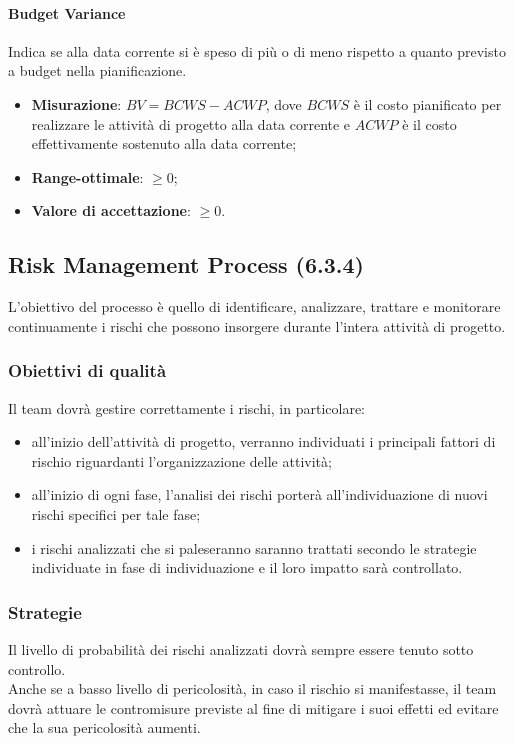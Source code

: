 \paragraph{Budget Variance}
\label{budgetVariance}
Indica se alla data corrente si è speso di più o di meno rispetto a quanto previsto a budget nella pianificazione.
\begin{itemize}
\item \textbf{Misurazione}: $BV = BCWS - ACWP$, dove $BCWS$ è il costo pianificato per realizzare le attività di progetto alla data corrente e $ACWP$ è il costo effettivamente sostenuto alla data corrente;
\item \textbf{Range-ottimale}: $\geq 0$;
\item \textbf{Valore di accettazione}: $\geq 0$.
\end{itemize}

\subsection{Risk Management Process (6.3.4)}
\label{riskMgmt}
L'obiettivo del processo è quello di identificare, analizzare, trattare e monitorare continuamente i rischi che possono insorgere durante l'intera attività di progetto.
\subsubsection{Obiettivi di qualità}
Il team dovrà gestire correttamente i rischi, in particolare:
\begin{itemize}
\item all'inizio dell'attività di progetto, verranno individuati i principali fattori di rischio riguardanti l'organizzazione delle attività;
\item all'inizio di ogni fase, l'analisi dei rischi porterà all'individuazione di nuovi rischi specifici per tale fase;
\item i rischi analizzati che si paleseranno saranno trattati secondo le strategie individuate in fase di individuazione e il loro impatto sarà controllato.
\end{itemize}
\subsubsection{Strategie}
Il livello di probabilità dei rischi analizzati dovrà sempre essere tenuto sotto controllo.\\
Anche se a basso livello di pericolosità, in caso il rischio si manifestasse, il team dovrà attuare le contromisure previste al fine di mitigare i suoi effetti ed evitare che la sua pericolosità aumenti.
